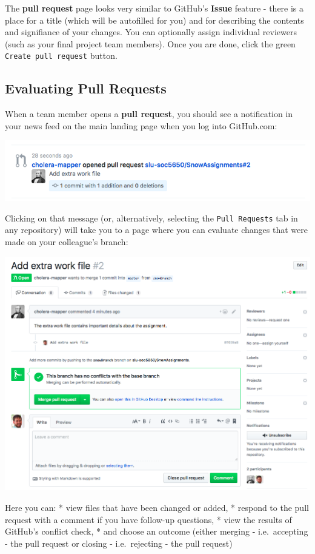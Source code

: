 \documentclass[]{book}
\theoremstyle{definition}
\theoremstyle{definition}
\theoremstyle{remark}
\begin{document}
The \textbf{pull request} page looks very similar to GitHub's
\textbf{Issue} feature - there is a place for a title (which will be
autofilled for you) and for describing the contents and signifiance of
your changes. You can optionally assign individual reviewers (such as
your final project team members). Once you are done, click the green
\texttt{Create\ pull\ request} button.

\subsection{Evaluating Pull Requests}\label{evaluating-pull-requests}

When a team member opens a \textbf{pull request}, you should see a
notification in your news feed on the main landing page when you log
into GitHub.com:

\includegraphics[width=1\linewidth]{images/branch6}

Clicking on that message (or, alternatively, selecting the
\texttt{Pull\ Requests} tab in any repository) will take you to a page
where you can evaluate changes that were made on your colleague's
branch:

\includegraphics[width=1\linewidth]{images/branch7}

Here you can: * view files that have been changed or added, * respond to
the pull request with a comment if you have follow-up questions, * view
the results of GitHub's conflict check, * and choose an outcome (either
merging - i.e.~accepting - the pull request or closing - i.e.~rejecting
- the pull request)
\end{document}
